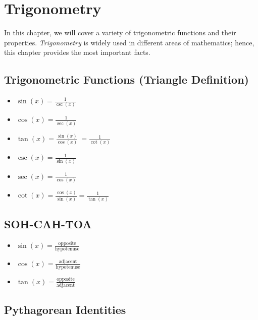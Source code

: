 \chapter{Trigonometry}

In this chapter, we will cover a variety of trigonometric functions and their properties. \emph{Trigonometry} is widely 
used in different areas of mathematics; hence, this chapter provides the most important facts.

\section{Trigonometric Functions (Triangle Definition)}

\begin{itemize}

    \item \( \sin(x) = \frac{1}{\csc(x)} \)

    \item \( \cos(x) = \frac{1}{\sec(x)}\)

    \item \( \tan(x) = \frac{\sin(x)}{\cos(x)}\ = \frac{1}{\cot(x)}\)

    \item \( \csc(x) = \frac{1}{\sin(x)} \)

    \item \( \sec(x) = \frac{1}{\cos(x)} \)

    \item \( \cot(x) = \frac{\cos(x)}{\sin(x)} = \frac{1}{\tan(x)} \)

\end{itemize}

\section{SOH-CAH-TOA}

\begin{itemize}

    \item \( \sin(x) = \frac{\text{opposite}}{\text{hypotenuse}} \)

    \item \( \cos(x) = \frac{\text{adjacent}}{\text{hypotenuse}} \)

    \item \( \tan(x) = \frac{\text{opposite}}{\text{adjacent}} \)

\end{itemize}

\section{Pythagorean Identities}

